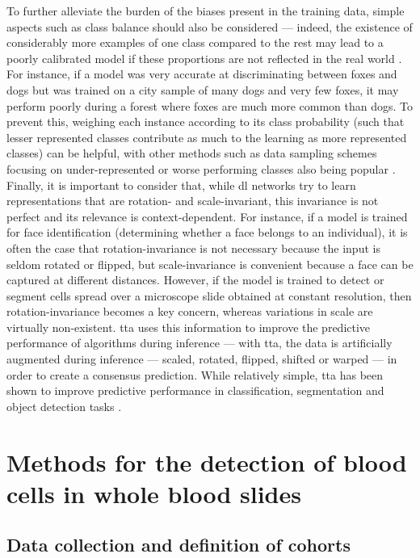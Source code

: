 To further alleviate the burden of the biases present in the training data, simple aspects such as class balance should also be considered --- indeed, the existence of considerably more examples of one class compared to the rest may lead to a poorly calibrated model if these proportions are not reflected in the real world \cite{Van_Calster2019-zp}. For instance, if a model was very accurate at discriminating between foxes and dogs but was trained on a city sample of many dogs and very few foxes, it may perform poorly during a forest where foxes are much more common than dogs. To prevent this, weighing each instance according to its class probability (such that lesser represented classes contribute as much to the learning as more represented classes) can be helpful, with other methods such as data sampling schemes focusing on under-represented or worse performing classes also being popular \cite{Johnson2019-cf}. Finally, it is important to consider that, while \ac{dl} networks try to learn representations that are rotation- and scale-invariant, this invariance is not perfect and its relevance is context-dependent. For instance, if a model is trained for face identification (determining whether a face belongs to an individual), it is often the case that rotation-invariance is not necessary because the input is seldom rotated or flipped, but scale-invariance is convenient because a face can be captured at different distances. However, if the model is trained to detect or segment cells spread over a microscope slide obtained at constant resolution, then rotation-invariance becomes a key concern, whereas variations in scale are virtually non-existent. \Ac{tta} uses this information to improve the predictive performance of algorithms during inference --- with \ac{tta}, the data is artificially augmented during inference --- scaled, rotated, flipped, shifted or warped --- in order to create a consensus prediction. While relatively simple, \ac{tta} has been shown to improve predictive performance in classification, segmentation and object detection tasks \cite{Moshkov2020-rc,Shorten2019-hr}.

\section{Methods for the detection of blood cells in whole blood slides}

\subsection{Data collection and definition of cohorts}

